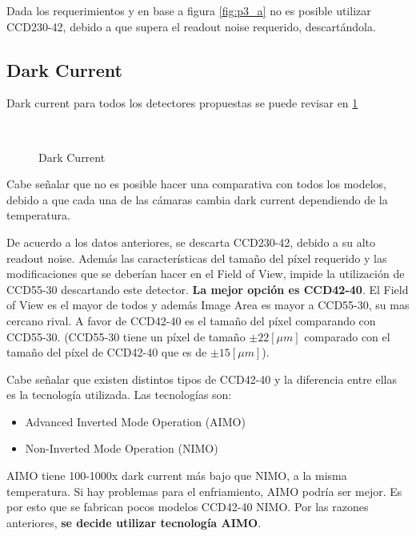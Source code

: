 \documentclass[a4paper,10pt]{article}
\begin{document}
Dada los requerimientos y en base a figura \ref{fig:p3_a}  no es posible
utilizar CCD230-42, debido a que supera el readout noise requerido, descartándola. 

\subsection{Dark Current}
Dark current para todos los detectores propuestas se puede revisar en \ref{fig:p3_c}
\begin{figure}[ht!]
  \centering
  ~ 
  \caption{Dark Current}
  \label{fig:p3_c}
\end{figure}

Cabe señalar que no es posible hacer una comparativa con todos los modelos,
debido a que cada una de las cámaras cambia dark current dependiendo de la
temperatura.

De acuerdo a los datos anteriores, se descarta CCD230-42, debido a su alto
readout noise. Además las características del tamaño del píxel requerido y las
modificaciones que se deberían hacer en el Field of View, impide la utilización
de CCD55-30 descartando este detector. \textbf{La mejor opción es CCD42-40}. El
Field of View es el mayor de todos y además Image Area es mayor a CCD55-30, su
mas cercano rival. A favor de CCD42-40 es el tamaño del píxel comparando con
CCD55-30. (CCD55-30 tiene un píxel de tamaño $\pm 22 [\mu m]$ comparado con el
tamaño del píxel de CCD42-40 que es de $\pm 15 [\mu m]$).

Cabe señalar que existen distintos tipos de CCD42-40 y la diferencia entre
ellas es la tecnología utilizada. Las tecnologías son:

\begin{itemize} 
\item Advanced Inverted Mode Operation (AIMO)
\item Non-Inverted Mode Operation (NIMO)
\end{itemize}

AIMO tiene 100-1000x dark current más bajo que NIMO, a la misma temperatura.
Si hay problemas para el enfriamiento, AIMO podría ser mejor. Es por esto que
se fabrican pocos modelos CCD42-40 NIMO. Por las razones anteriores, \textbf{se
decide utilizar tecnología AIMO}.
\end{document}
